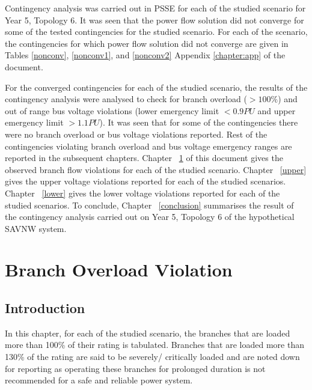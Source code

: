 \documentclass[10pt]{report}
\begin{document}
Contingency analysis was carried out in PSSE for each of the studied scenario for Year 5, Topology 6. It was seen that the power flow solution did not converge for some of the tested contingencies for the studied scenario. 
For each of the scenario, the contingencies for which power flow solution did not converge are given in Tables \ref{nonconv}, \ref{nonconv1}, and \ref{nonconv2} Appendix \ref{chapter:app} of the document. 

For the converged contingencies for each of the studied scenario, the results of the contingency analysis were analysed to check for branch overload ($ > 100\%$) and out of range bus voltage violations (lower emergency limit $ < 0.9 PU $ and upper emergency limit $ > 1.1 PU$). It was seen that for some of the contingencies there were no branch overload or bus voltage violations reported. Rest of the contingencies violating branch overload and bus voltage emergency ranges are reported in the subsequent chapters. Chapter ~\ref{overload} of this document gives the observed branch flow violations for each of the studied scenario. Chapter ~\ref{upper} gives the upper voltage violations reported for each of the studied scenarios. Chapter ~\ref{lower} gives the lower voltage violations reported for each of the studied scenarios. To conclude, Chapter ~\ref{conclusion} summarises the result of the contingency analysis carried out on Year 5, Topology 6 of the hypothetical SAVNW system. 

\chapter{Branch Overload Violation}
\label{overload}
\section{Introduction}
In this chapter, for each of the studied scenario, the branches that are loaded more than 100\% of their rating is tabulated. Branches that are loaded more than 130\% of the rating are said to be severely/ critically loaded and are noted down for reporting as operating these branches for prolonged duration is not recommended for a safe and reliable power system.
\end{document}
